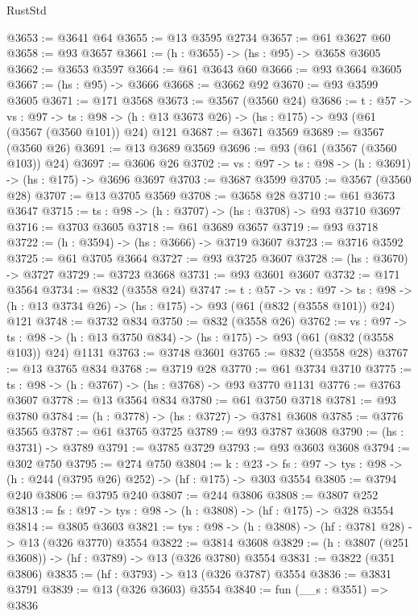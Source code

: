 \begin{lexlean}{RustStd}
\begin{coremodule}
@3653 := @3641 @64
@3655 := @13 @3595 @2734
@3657 := @61 @3627 @60
@3658 := @93 @3657
@3661 := (h : @3655) -> (hs : @95) -> @3658 @3605
@3662 := @3653 @3597
@3664 := @61 @3643 @60
@3666 := @93 @3664 @3605
@3667 := (hs : @95) -> @3666
@3668 := @3662 @92
@3670 := @93 @3599 @3605
@3671 := @171 @3568
@3673 := @3567 (@3560 @24)
@3686 := {t : @57} ->
  {vs : @97} ->
  {ts : @98} -> (h : @13 @3673 @26) -> (hs : @175) -> @93 (@61 (@3567 (@3560 @101)) @24) @121
@3687 := @3671 @3569
@3689 := @3567 (@3560 @26)
@3691 := @13 @3689 @3569
@3696 := @93 (@61 (@3567 (@3560 @103)) @24)
@3697 := @3606 @26
@3702 := {vs : @97} -> {ts : @98} -> (h : @3691) -> (hs : @175) -> @3696 @3697
@3703 := @3687 @3599
@3705 := @3567 (@3560 @28)
@3707 := @13 @3705 @3569
@3708 := @3658 @28
@3710 := @61 @3673 @3647
@3715 := {ts : @98} -> (h : @3707) -> (hs : @3708) -> @93 @3710 @3697
@3716 := @3703 @3605
@3718 := @61 @3689 @3657
@3719 := @93 @3718
@3722 := (h : @3594) -> (hs : @3666) -> @3719 @3607
@3723 := @3716 @3592
@3725 := @61 @3705 @3664
@3727 := @93 @3725 @3607
@3728 := (hs : @3670) -> @3727
@3729 := @3723 @3668
@3731 := @93 @3601 @3607
@3732 := @171 @3564
@3734 := @832 (@3558 @24)
@3747 := {t : @57} ->
  {vs : @97} ->
  {ts : @98} -> (h : @13 @3734 @26) -> (hs : @175) -> @93 (@61 (@832 (@3558 @101)) @24) @121
@3748 := @3732 @834
@3750 := @832 (@3558 @26)
@3762 := {vs : @97} ->
  {ts : @98} -> (h : @13 @3750 @834) -> (hs : @175) -> @93 (@61 (@832 (@3558 @103)) @24) @1131
@3763 := @3748 @3601
@3765 := @832 (@3558 @28)
@3767 := @13 @3765 @834
@3768 := @3719 @28
@3770 := @61 @3734 @3710
@3775 := {ts : @98} -> (h : @3767) -> (hs : @3768) -> @93 @3770 @1131
@3776 := @3763 @3607
@3778 := @13 @3564 @834
@3780 := @61 @3750 @3718
@3781 := @93 @3780
@3784 := (h : @3778) -> (hs : @3727) -> @3781 @3608
@3785 := @3776 @3565
@3787 := @61 @3765 @3725
@3789 := @93 @3787 @3608
@3790 := (hs : @3731) -> @3789
@3791 := @3785 @3729
@3793 := @93 @3603 @3608
@3794 := @302 @750
@3795 := @274 @750
@3804 := {k : @23} ->
  {fs : @97} -> {tys : @98} -> (h : @244 (@3795 @26) @252) -> (hf : @175) -> @303 @3554
@3805 := @3794 @240
@3806 := @3795 @240
@3807 := @244 @3806
@3808 := @3807 @252
@3813 := {fs : @97} -> {tys : @98} -> (h : @3808) -> (hf : @175) -> @328 @3554
@3814 := @3805 @3603
@3821 := {tys : @98} -> (h : @3808) -> (hf : @3781 @28) -> @13 (@326 @3770) @3554
@3822 := @3814 @3608
@3829 := (h : @3807 (@251 @3608)) -> (hf : @3789) -> @13 (@326 @3780) @3554
@3831 := @3822 (@351 @3806)
@3835 := (hf : @3793) -> @13 (@326 @3787) @3554
@3836 := @3831 @3791
@3839 := @13 (@326 @3603) @3554
@3840 := fun (__s : @3551) => @3836

\end{coremodule}
\end{lexlean}
